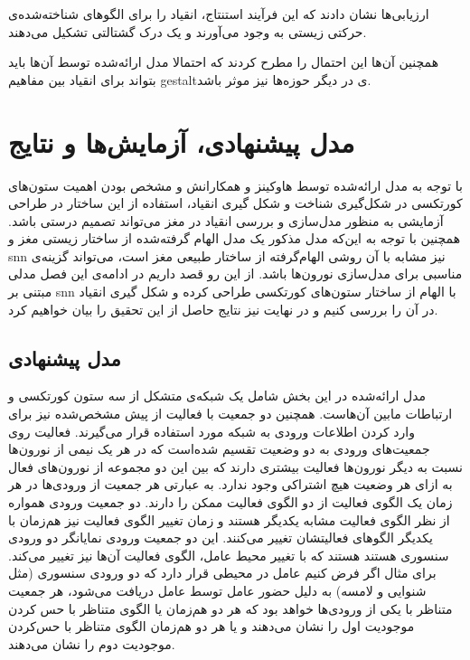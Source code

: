 \documentclass[12pt]{report}
\begin{document}
ارزیابی‌ها نشان دادند که این فرآیند استنتاج، انقیاد را برای الگو‌های شناخته‌شده‌ی حرکتی زیستی به وجود می‌آورند و یک درک گشتالتی  تشکیل می‌دهند.
	
	همچنین آن‌ها این احتمال را مطرح کردند که احتمالا مدل ارائه‌شده توسط آن‌ها باید بتواند برای انقیاد بین مفاهیم \gls{gestalt}ی در دیگر حوزه‌ها نیز موثر باشد.
	
	
	\chapter{مدل پیشنهادی، آزمایش‌ها و نتایج}
	
	با توجه به مدل ارائه‌شده توسط‌ هاوکینز و همکارانش و مشخص بودن اهمیت ستون‌های کورتکسی در شکل‌گیری شناخت و شکل گیری انقیاد، استفاده از این ساختار در طراحی آزمایشی به منظور مدل‌سازی و بررسی انقیاد در مغز می‌تواند تصمیم درستی باشد. همچنین با توجه به این‌که مدل مذکور یک مدل الهام گرفته‌شده از ساختار زیستی مغز و \gls{snn} نیز مشابه با آن روشی الهام‌گرفته از ساختار طبیعی مغز است، می‌تواند گزینه‌ی مناسبی برای مدل‌سازی نورون‌ها باشد. از این رو قصد داریم در ادامه‌ی این فصل مدلی مبتنی بر \gls{snn} با الهام از ساختار ستون‌های کورتکسی طراحی کرده و شکل گیری انقیاد در آن را بررسی کنیم و در نهایت نیز نتایج حاصل از این تحقیق را بیان خواهیم کرد.
	
	\section{مدل پیشنهادی}
	
	مدل ارائه‌شده در این بخش شامل یک شبکه‌ی متشکل از سه ستون کورتکسی و ارتباطات مابین آن‌هاست. همچنین دو جمعیت با فعالیت از پیش مشخص‌شده نیز برای وارد کردن اطلاعات ورودی به شبکه مورد استفاده قرار می‌گیرند. فعالیت روی جمعیت‌های ورودی به دو وضعیت تقسیم شده‌است که در هر یک نیمی از نورون‌ها نسبت به دیگر نورون‌ها فعالیت بیشتری دارند که بین این دو مجموعه از نورون‌های فعال به ازای هر وضعیت هیچ اشتراکی وجود ندارد. به عبارتی هر جمعیت از ورودی‌ها در هر زمان یک الگوی فعالیت از دو الگوی فعالیت ممکن را دارند. دو جمعیت ورودی همواره از نظر الگوی فعالیت مشابه یکدیگر هستند و زمان تغییر الگوی فعالیت نیز هم‌زمان با یکدیگر الگو‌های فعالیتشان تغییر می‌کنند. این دو جمعیت ورودی نمایانگر دو ورودی سنسوری هستند هستند که با تغییر محیط عامل، الگوی فعالیت آن‌ها نیز تغییر می‌کند. برای مثال اگر فرض کنیم عامل در محیطی قرار دارد که دو ورودی سنسوری (مثل شنوایی و لامسه) به دلیل حضور عامل توسط عامل دریافت می‌شود، هر جمعیت متناظر با یکی از ورودی‌ها خواهد بود که هر دو هم‌زمان یا الگوی متناظر با حس کردن موجودیت اول را نشان‌ می‌دهند و یا هر دو هم‌زمان الگوی متناظر با حس‌کردن موجودیت دوم را نشان می‌دهند.
	
\end{document}
